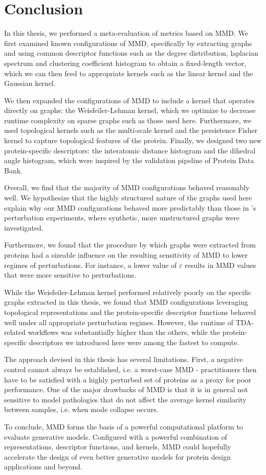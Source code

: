 \chapter{Conclusion}\label{chap:conclusion}

In this thesis, we performed a meta-evaluation of metrics based on MMD. We first
examined known configurations of MMD, specifically by extracting graphs and
using common descriptor functions such as the degree distribution, laplacian
spectrum and clustering coefficient histogram to obtain a fixed-length vector,
which we can then feed to appropriate kernels such as the linear kernel and the
Gaussian kernel.

We then expanded the configurations of MMD to include a kernel that operates
directly on graphs: the Weisfeiler-Lehman kernel, which we optimize to decrease
runtime complexity on sparse graphs such as those used here. Furthermore, we
used topological kernels such as the multi-scale kernel and the persistence
Fisher kernel to capture topological features of the protein. Finally, we
designed two new protein-specific descriptors: the interatomic distance
histogram and the dihedral angle histogram, which were inspired by the
validation pipeline of Protein Data Bank.

Overall, we find that the majority of MMD configurations behaved reasonably
well. We hypothesize that the highly structured nature of the graphs used here
explain why our MMD configurations behaved more predictably than those
in \cite{o2021evaluation}'s perturbation experiments, where synthetic, more
unstructured graphs were investigated.

Furthermore, we found that the procedure by which graphs were extracted from
proteins had a sizeable influence on the resulting sensitivity of MMD to lower
regimes of perturbations. For instance, a lower value of $\varepsilon$ results
in MMD values that were more sensitive to perturbations.

While the Weisfeiler-Lehman kernel performed relatively poorly on the specific
graphs extracted in this thesis, we found that MMD configurations leveraging
topological representations and the protein-specific descriptor functions
behaved well under all appropriate perturbation regimes. However, the runtime of
TDA-related workflows was substantially higher than the others, while the
protein-specific descriptors we introduced here were among the fastest to
compute.

The approach devised in this thesis has several limitations. First, a negative
control cannot always be established, i.e. a worst-case MMD - practitioners then
have to be satisfied with a highly perturbed set of proteins as a proxy for poor
performance. One of the major drawbacks of MMD is that it is in general not
sensitive to model pathologies that do not affect the average kernel similarity
between samples, i.e. when mode collapse occurs.

To conclude, MMD forms the basis of a powerful computational platform to
evaluate generative models. Configured with a powerful combination of
representations, descriptor functions, and kernels, MMD could hopefully
accelerate the design of even better generative models for protein design
applications and beyond.
